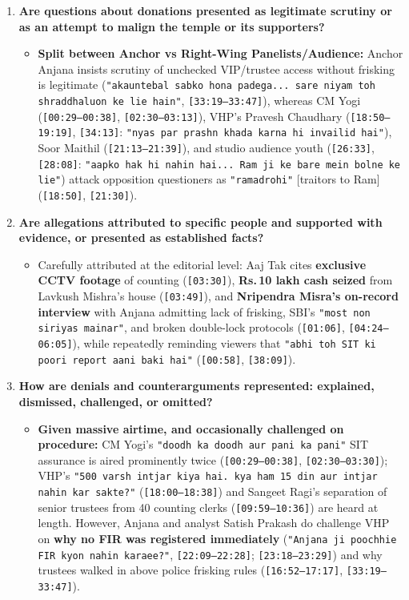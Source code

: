 \documentclass[10pt,a4paper]{article}
\begin{document}
\begin{enumerate}[leftmargin=1.6em, itemsep=4pt, topsep=4pt]
\begin{itemize}[leftmargin=1.4em, itemsep=2pt, topsep=2pt]
  \end{itemize}
  \item \textbf{Are questions about donations presented as legitimate scrutiny or as an attempt to malign the temple or its supporters?}
  \begin{itemize}[leftmargin=1.4em, itemsep=2pt, topsep=2pt]
    \item \textbf{Split between Anchor vs Right-Wing Panelists/Audience:} Anchor Anjana insists scrutiny of unchecked VIP/trustee access without frisking is legitimate (\texttt{"akauntebal sabko hona padega... sare niyam toh shraddhaluon ke lie hain"}, \texttt{[33:19--33:47]}), whereas CM Yogi (\texttt{[00:29--00:38]}, \texttt{[02:30--03:13]}), VHP's Pravesh Chaudhary (\texttt{[18:50--19:19]}, \texttt{[34:13]}: \texttt{"nyas par prashn khada karna hi invailid hai"}), Soor Maithil (\texttt{[21:13--21:39]}), and studio audience youth (\texttt{[26:33]}, \texttt{[28:08]}: \texttt{"aapko hak hi nahin hai... Ram ji ke bare mein bolne ke lie"}) attack opposition questioners as \texttt{"ramadrohi"} [traitors to Ram] (\texttt{[18:50]}, \texttt{[21:30]}).
  \end{itemize}
  \item \textbf{Are allegations attributed to specific people and supported with evidence, or presented as established facts?}
  \begin{itemize}[leftmargin=1.4em, itemsep=2pt, topsep=2pt]
    \item Carefully attributed at the editorial level: Aaj Tak cites \textbf{exclusive CCTV footage} of counting (\texttt{[03:30]}), \textbf{Rs.\,10 lakh cash seized} from Lavkush Mishra's house (\texttt{[03:49]}), and \textbf{Nripendra Misra's on-record interview} with Anjana admitting lack of frisking, SBI's \texttt{"most non siriyas mainar"}, and broken double-lock protocols (\texttt{[01:06]}, \texttt{[04:24--06:05]}), while repeatedly reminding viewers that \texttt{"abhi toh SIT ki poori report aani baki hai"} (\texttt{[00:58]}, \texttt{[38:09]}).
  \end{itemize}
  \item \textbf{How are denials and counterarguments represented: explained, dismissed, challenged, or omitted?}
  \begin{itemize}[leftmargin=1.4em, itemsep=2pt, topsep=2pt]
    \item \textbf{Given massive airtime, and occasionally challenged on procedure:} CM Yogi's \texttt{"doodh ka doodh aur pani ka pani"} SIT assurance is aired prominently twice (\texttt{[00:29--00:38]}, \texttt{[02:30--03:30]}); VHP's \texttt{"500 varsh intjar kiya hai. kya ham 15 din aur intjar nahin kar sakte?"} (\texttt{[18:00--18:38]}) and Sangeet Ragi's separation of senior trustees from 40 counting clerks (\texttt{[09:59--10:36]}) are heard at length. However, Anjana and analyst Satish Prakash do challenge VHP on \textbf{why no FIR was registered immediately} (\texttt{"Anjana ji poochhie FIR kyon nahin karaee?"}, \texttt{[22:09--22:28]}; \texttt{[23:18--23:29]}) and why trustees walked in above police frisking rules (\texttt{[16:52--17:17]}, \texttt{[33:19--33:47]}).

\end{itemize}
\end{enumerate}
\end{document}
